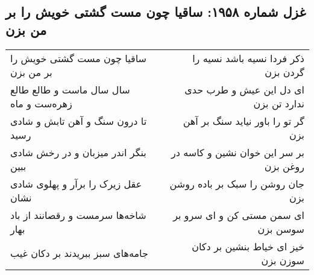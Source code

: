 \begin{center}
\section*{غزل شماره ۱۹۵۸: ساقیا چون مست گشتی خویش را بر من بزن}
\label{sec:1958}
\begin{longtable}{l p{0.5cm} r}
ساقیا چون مست گشتی خویش را بر من بزن
&&
ذکر فردا نسیه باشد نسیه را گردن بزن
\\
سال سال ماست و طالع طالع زهره‌ست و ماه
&&
ای دل این عیش و طرب حدی ندارد تن بزن
\\
تا درون سنگ و آهن تابش و شادی رسید
&&
گر تو را باور نیاید سنگ بر آهن بزن
\\
بنگر اندر میزبان و در رخش شادی ببین
&&
بر سر این خوان نشین و کاسه در روغن بزن
\\
عقل زیرک را برآر و پهلوی شادی نشان
&&
جان روشن را سبک بر باده روشن بزن
\\
شاخه‌ها سرمست و رقصانند از باد بهار
&&
ای سمن مستی کن و ای سرو بر سوسن بزن
\\
جامه‌های سبز ببریدند بر دکان غیب
&&
خیز ای خیاط بنشین بر دکان سوزن بزن
\\
\end{longtable}
\end{center}

